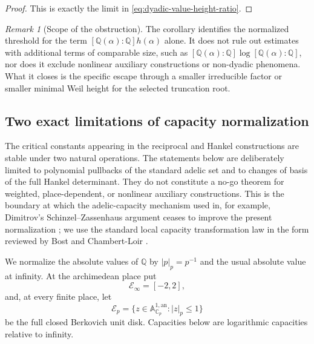 \documentclass[11pt]{article}
\theoremstyle{definition}
\theoremstyle{remark}
\newtheorem{remark}[theorem]{Remark}
\newcommand{\Q}{\mathbb Q}
\newcommand{\C}{\mathbb C}
\begin{document}
\begin{proof}
This is exactly the limit in
\eqref{eq:dyadic-value-height-ratio}.
\end{proof}

\begin{remark}[Scope of the obstruction]
The corollary identifies the normalized threshold for the term
\([\Q(\alpha):\Q]h(\alpha)\) alone.  It does not rule out estimates with
additional terms of comparable size, such as
\([\Q(\alpha):\Q]\log[\Q(\alpha):\Q]\), nor does it exclude nonlinear
auxiliary constructions or non-dyadic phenomena.  What it closes is the
specific escape through a smaller irreducible factor or smaller minimal
Weil height for the selected truncation root.
\end{remark}

\subsection{Two exact limitations of capacity normalization}
\label{subsec:capacity-pullback-limitations}

The critical constants appearing in the reciprocal and Hankel constructions
are stable under two natural operations.  The statements below are deliberately
limited to polynomial pullbacks of the standard adelic set and to changes of
basis of the full Hankel determinant.  They do not constitute a no-go theorem
for weighted, place-dependent, or nonlinear auxiliary constructions.  This is
the boundary at which the adelic-capacity mechanism used in, for example,
Dimitrov's Schinzel--Zassenhaus argument ceases to improve the present
normalization \cite{Dimitrov2019}; we use the standard local capacity
transformation law in the form reviewed by Bost and Chambert-Loir
\cite{BostChambertLoir2009}.

We normalize the absolute values of \(\Q\) by
\(|p|_p=p^{-1}\) and the usual absolute value at infinity.  At the
archimedean place put
\[
 \mathcal E_\infty=[-2,2],
\]
and, at every finite place, let
\[
 \mathcal E_p=
 \bigl\{z\in\mathbb A_{\C_p}^{1,\mathrm{an}}:|z|_p\leq1\bigr\}
\]
be the full closed Berkovich unit disk.  Capacities below are logarithmic
capacities relative to infinity.
\end{document}
